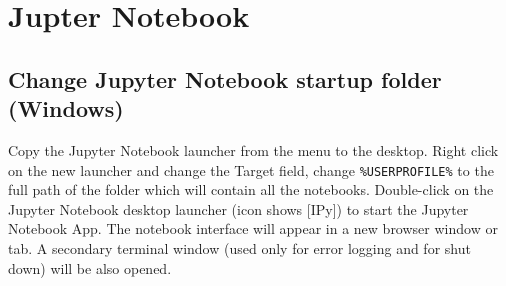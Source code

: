 \section{Jupter Notebook}

\subsection{Change Jupyter Notebook startup folder (Windows)}
Copy the Jupyter Notebook launcher from the menu to the desktop.
Right click on the new launcher and change the Target field, change \verb|%USERPROFILE%| to the full path of the folder which will contain all the notebooks.
Double-click on the Jupyter Notebook desktop launcher (icon shows [IPy]) to start the Jupyter Notebook App. The notebook interface will appear in a new browser window or tab. A secondary terminal window (used only for error logging and for shut down) will be also opened.



